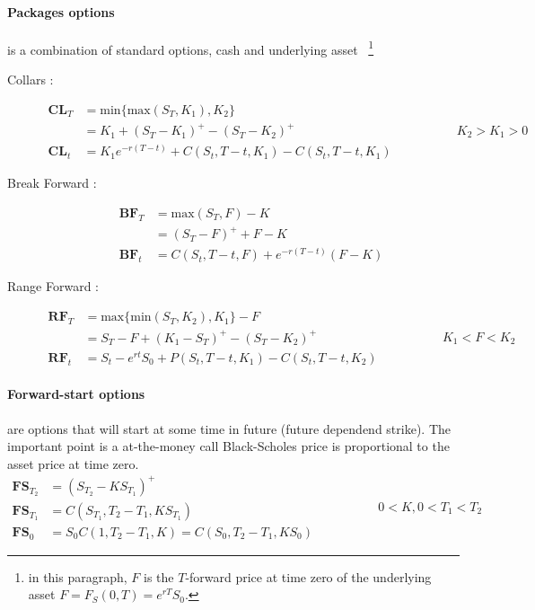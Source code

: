 \documentclass[a4paper,10pt]{article}
\begin{document}
\paragraph{Packages options} is a combination of standard options, cash and underlying asset ~\footnote{in this paragraph, $F$ is the $T$-forward price at time zero of the underlying asset $F = F_{S}(0,T)= e^{rT} S_0$.}
\begin{description}
 \item[Collars : ] 
\[ 
\begin{array}{rl}
\textbf{CL}_T &= \text{min}\{ \text{max}(S_T,K_1),K_2\} \\
              &= K_1 +(S_T-K_1)^+ - (S_T - K_2)^+       \\
\textbf{CL}_t &= K_1e^{-r(T-t)} + C(S_t,T-t,K_1)- C(S_t,T-t,K_1)
\end{array} 
\hspace{2cm} K_2>K_1>0
\]
 \item[Break Forward : ] 
\[
\begin{array}{rl}
 \textbf{BF}_T &= \text{max}(S_T,F)-K \\
               &= (S_T- F)^+ +F -K    \\
 \textbf{BF}_t &= C(S_t,T-t,F) + e^{-r(T-t)}(F-K) 
\end{array} 
\]
\item[Range Forward : ] 
\[
\begin{array}{rl}
\textbf{RF}_T  &= \text{max}\{ \text{min}(S_T,K_2),K_1\} - F  \\
               &= S_T - F +(K_1 - S_T)^+ - (S_T-K_2)^+        \\
\textbf{RF}_t  &= S_t - e^{rt}S_{0} + P(S_t,T-t,K_1) - C(S_t,T-t,K_2)
\end{array} 
\hspace{2cm} K_1<F<K_2
\]
\end{description}
\paragraph{Forward-start options} are options that will start at some time in future (future dependend strike). The important point is a at-the-money call Black-Scholes price is proportional to the asset price at time zero.
\[
\begin{array}{rl}
\textbf{FS}_{T_2} &=  (S_{T_2} - KS_{T_1})^+  \\
\textbf{FS}_{T_1} &= C( S_{T_1},T_2 - T_1, KS_{T_1} )    \\
\textbf{FS}_{0} &= S_0 C( 1,T_2 - T_1, K ) = C( S_0 ,T_2 - T_1, KS_0 ) 
\end{array}
\hspace{2cm}
0<K,0<T_1<T_2
\]
\end{document}
